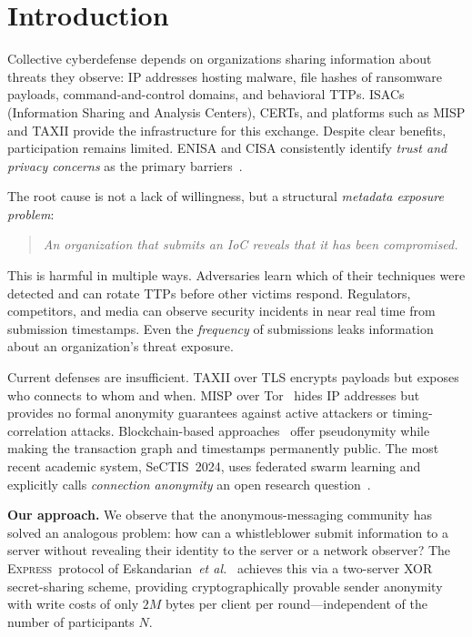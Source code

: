 \documentclass[letterpaper,twocolumn,10pt]{article}
\newcommand{\express}{\textsc{Express}}
\newcommand{\etal}{\textit{et al.}\xspace}
\begin{document}
\section{Introduction}
\label{sec:intro}

Collective cyberdefense depends on organizations sharing information
about threats they observe: IP addresses hosting malware, file hashes
of ransomware payloads, command-and-control domains, and behavioral
TTPs. ISACs (Information Sharing and Analysis Centers), CERTs, and
platforms such as MISP and TAXII provide the infrastructure for this
exchange. Despite clear benefits, participation remains limited.
ENISA and CISA consistently identify \emph{trust and privacy concerns}
as the primary barriers~\cite{enisa_cti_barriers,cisa_sharing}.

The root cause is not a lack of willingness, but a structural
\emph{metadata exposure problem}:

\begin{quote}
  \emph{An organization that submits an IoC reveals that it has been
  compromised.}
\end{quote}

This is harmful in multiple ways. Adversaries learn which of their
techniques were detected and can rotate TTPs before other victims
respond. Regulators, competitors, and media can observe security
incidents in near real time from submission timestamps. Even the
\emph{frequency} of submissions leaks information about an
organization's threat exposure.

Current defenses are insufficient. TAXII over TLS encrypts payloads
but exposes who connects to whom and when. MISP over
Tor~\cite{wagner2018} hides IP addresses but provides no formal
anonymity guarantees against active attackers or timing-correlation
attacks. Blockchain-based approaches~\cite{TODO_blockchain_cti} offer
pseudonymity while making the transaction graph and timestamps
permanently public. The most recent academic system, SeCTIS~2024, uses
federated swarm learning and explicitly calls \emph{connection
anonymity} an open research question~\cite{alsaedi2024sectis}.

\textbf{Our approach.} We observe that the anonymous-messaging
community has solved an analogous problem: how can a whistleblower
submit information to a server without revealing their identity to the
server or a network observer? The \express\ protocol of
Eskandarian~\etal~\cite{eskandarian2021express} achieves this via a
two-server XOR secret-sharing scheme, providing cryptographically
provable sender anonymity with write costs of only $2M$ bytes per
client per round—independent of the number of participants $N$.
\end{document}
